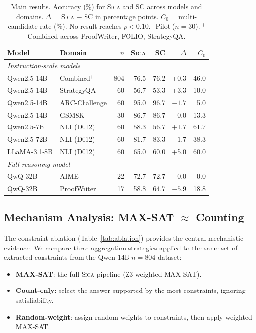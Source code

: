 \documentclass[11pt,a4paper]{article}
\newcommand{\sica}{\textsc{Sica}}
\newcommand{\czero}{C_0}
\begin{document}
\begin{table}[t]
\centering
\caption{Main results. Accuracy (\%) for \sica{} and SC across models and domains. $\Delta$ = \sica{} $-$ SC in percentage points. $\czero$ = multi-candidate rate (\%). No result reaches $p < 0.10$. $^\dagger$Pilot ($n=30$). $^\ddagger$Combined across ProofWriter, FOLIO, StrategyQA.}
\label{tab:main}
\small
\begin{tabular}{llrrrrr}
\toprule
\textbf{Model} & \textbf{Domain} & \textbf{$n$} & \textbf{\sica} & \textbf{SC} & \textbf{$\Delta$} & \textbf{$\czero$} \\
\midrule
\multicolumn{7}{l}{\emph{Instruction-scale models}} \\
Qwen2.5-14B & Combined$^\ddagger$ & 804 & 76.5 & 76.2 & +0.3 & 46.0 \\
Qwen2.5-14B & StrategyQA & 60 & 56.7 & 53.3 & +3.3 & 10.0 \\
Qwen2.5-14B & ARC-Challenge & 60 & 95.0 & 96.7 & $-1.7$ & 5.0 \\
Qwen2.5-14B & GSM8K$^\dagger$ & 30 & 86.7 & 86.7 & 0.0 & 13.3 \\
Qwen2.5-7B & NLI (D012) & 60 & 58.3 & 56.7 & +1.7 & 61.7 \\
Qwen2.5-72B & NLI (D012) & 60 & 81.7 & 83.3 & $-1.7$ & 38.3 \\
LLaMA-3.1-8B & NLI (D012) & 60 & 65.0 & 60.0 & +5.0 & 60.0 \\
\midrule
\multicolumn{7}{l}{\emph{Full reasoning model}} \\
QwQ-32B & AIME & 22 & 72.7 & 72.7 & 0.0 & 0.0 \\
QwQ-32B & ProofWriter & 17 & 58.8 & 64.7 & $-5.9$ & 18.8 \\
\bottomrule
\end{tabular}
\end{table}

\subsection{Mechanism Analysis: MAX-SAT $\approx$ Counting}
\label{sec:ablation}

The constraint ablation (Table~\ref{tab:ablation}) provides the central mechanistic evidence. We compare three aggregation strategies applied to the same set of extracted constraints from the Qwen-14B $n = 804$ dataset:

\begin{itemize}[nosep]
  \item \textbf{MAX-SAT}: the full \sica{} pipeline (Z3 weighted MAX-SAT).
  \item \textbf{Count-only}: select the answer supported by the most constraints, ignoring satisfiability.
  \item \textbf{Random-weight}: assign random weights to constraints, then apply weighted MAX-SAT.
\end{itemize}
\end{document}

